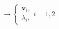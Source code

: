\documentclass[preview]{standalone}
\begin{document}
\begin{align*}
\to \begin{cases} \bm v_i,\\ \lambda_i, \end{cases} i=1,2
\end{align*}
\end{document}
